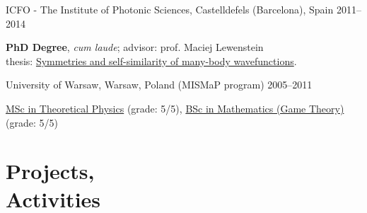 \documentclass[margin,line]{resume}
\begin{document}
\begin{resume}
    ICFO - The Institute of Photonic Sciences,  Castelldefels (Barcelona), Spain \hfill { 2011--2014}\\
   \begin{list2}
        \vspace*{-4mm}
        \item \textbf{PhD Degree}, \emph{cum laude}; advisor: prof. Maciej Lewenstein\\
            thesis: \href{http://arxiv.org/abs/1412.6796}{Symmetries and self-similarity of many-body wavefunctions}.
    \end{list2}
    \vspace*{-4mm}
    University of Warsaw, Warsaw, Poland (MISMaP program) \hfill { 2005--2011}\\
    \begin{list2}
      \vspace*{-4mm}
      \item \href{http://migdal.wikidot.com/en:collective-decoherence}{MSc in Theoretical Physics} (grade: 5/5),
      \href{http://migdal.wikidot.com/en:mafia}{BSc in Mathematics (Game Theory)} (grade: 5/5)
    \end{list2}


    \section{\mysidestyle Projects,\\Activities}


\end{resume}
\end{document}
